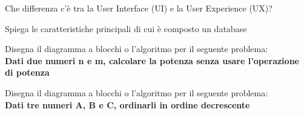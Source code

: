 \documentclass[addpoints]{exam}
\begin{document}
	
\begin{center}
\end{center}
\begin{questions}
	\bracketedpoints
	
	\question[3] Che differenza c'è tra la User Interface (UI) e la User Experience (UX)?
	
	\fillwithlines{2in}
	
	\question[3] Spiega le caratteristiche principali di cui è composto un database
	
	\fillwithlines{2in}
	
	\question[2] Disegna il diagramma a blocchi o l'algoritmo per il seguente problema:\\ \textbf{Dati due numeri n e m, calcolare la potenza senza usare l'operazione di potenza}
	
	\question[2] Disegna il diagramma a blocchi o l'algoritmo per il seguente problema:\\ \textbf{Dati tre numeri A, B e C, ordinarli in ordine decrescente}
	
	
\end{questions}

\begin{center}
	\gradetable[h][questions]
\end{center}
	
\end{document}
